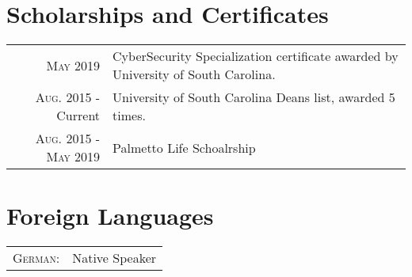 \documentclass[a4paper,10pt]{article}
\begin{document}
\section{Scholarships and Certificates}
\begin{tabular}{r|l}
 \textsc{May} 2019  & CyberSecurity Specialization certificate awarded by University of South Carolina. \\
  \textsc{Aug.} 2015 - Current  & University of South Carolina Deans list, awarded 5 times.\\
 \textsc{Aug.} 2015 - \textsc{May} 2019   & Palmetto Life Schoalrship\normalsize


\end{tabular}

\section{Foreign Languages}
\begin{tabular}{r|l}
\textsc{German:}&Native Speaker\\
\end{tabular}
\end{document}
